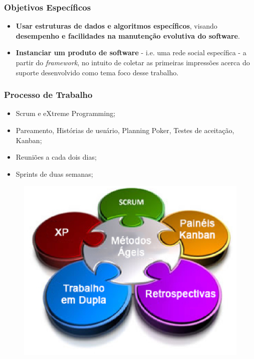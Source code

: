 \documentclass{beamer}
\begin{document}
\begin{frame}
\frametitle{Objetivos Específicos}

\begin{itemize}
	\item \textbf{Usar estruturas de dados e algoritmos específicos}, visando \textbf{desempenho e facilidades na manutenção evolutiva do software}.
	\item \textbf{Instanciar um produto de software} - i.e. uma rede social específica - a partir do \textit{framework}, no intuito de coletar as primeiras impressões acerca do suporte desenvolvido como tema foco desse trabalho.
\end{itemize}

\end{frame}

\begin{frame}
\frametitle{Processo de Trabalho}

\begin{itemize}
	\item Scrum e eXtreme Programming;
	\item Pareamento, Histórias de usuário, Planning Poker, Testes de aceitação, Kanban;
	\item Reuniões a cada dois dias;
	\item Sprints de duas semanas;
\end{itemize}

\begin{figure}[h]
	\centering
	\includegraphics[scale=0.35]{figuras/metodos-ageis.eps}
\end{figure}
\end{frame}
\end{document}
